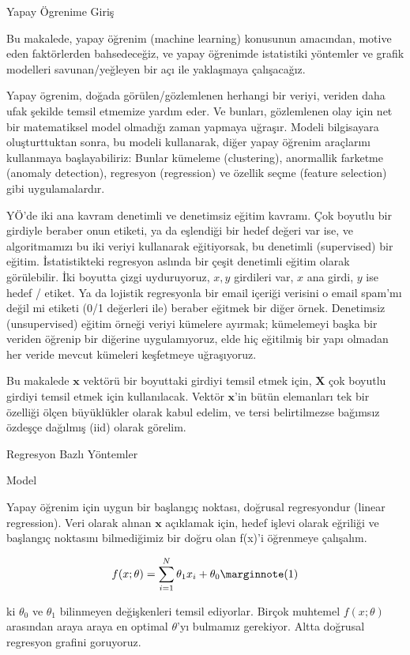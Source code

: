 \documentclass[12pt,fleqn]{article}\usepackage{../../common}
\begin{document}
Yapay Ögrenime Giriş

Bu makalede, yapay öğrenim (machine learning) konusunun amacından, motive eden
faktörlerden bahsedeceğiz, ve yapay öğrenimde istatistiki yöntemler ve
grafik modelleri savunan/yeğleyen bir açı ile yaklaşmaya çalışacağız. 

Yapay ögrenim, doğada görülen/gözlemlenen herhangi bir veriyi, veriden daha ufak
şekilde temsil etmemize yardım eder. Ve bunları, gözlemlenen olay için net bir
matematiksel model olmadığı zaman yapmaya uğraşır. Modeli bilgisayara
oluşturttuktan sonra, bu modeli kullanarak, diğer yapay öğrenim araçlarını
kullanmaya başlayabiliriz: Bunlar kümeleme (clustering), anormallik farketme
(anomaly detection), regresyon (regression) ve özellik seçme (feature selection)
gibi uygulamalardır.

YÖ'de iki ana kavram denetimli ve denetimsiz eğitim kavramı. Çok boyutlu
bir girdiyle beraber onun etiketi, ya da eşlendiği bir hedef değeri var
ise, ve algoritmamızı bu iki veriyi kullanarak eğitiyorsak, bu denetimli
(supervised) bir eğitim. İstatistikteki regresyon aslında bir çeşit
denetimli eğitim olarak görülebilir. İki boyutta çizgi uyduruyoruz, $x,y$
girdileri var, $x$ ana girdi, $y$ ise hedef / etiket. Ya da lojistik
regresyonla bir email içeriği verisini o email spam'mı değil mi etiketi
(0/1 değerleri ile) beraber eğitmek bir diğer örnek. Denetimsiz
(unsupervised) eğitim örneği veriyi kümelere ayırmak; kümelemeyi başka bir
veriden öğrenip bir diğerine uygulamıyoruz, elde hiç eğitilmiş bir yapı
olmadan her veride mevcut kümeleri keşfetmeye uğraşıyoruz.

Bu makalede $\mathbf{x}$ vektörü bir boyuttaki girdiyi temsil etmek için,
$\mathbf{X}$ çok boyutlu girdiyi temsil etmek için kullanılacak. Vektör
$\mathbf{x}$'in bütün elemanları tek bir özelliği ölçen büyüklükler olarak
kabul edelim, ve tersi belirtilmezse bağımsız özdeşçe dağılmış (iid) olarak
görelim.

Regresyon Bazlı Yöntemler

Model

Yapay öğrenim için uygun bir başlangıç noktası, doğrusal regresyondur (linear
regression). Veri olarak alınan $\mathbf{x}$ açıklamak için, hedef işlevi olarak
eğriliği ve başlangıç noktasını bilmediğimiz bir doğru olan f(x)'i öğrenmeye
çalışalım. 

$$
  f(x;\theta) = \sum_{i=1}^N \theta_{1}x_{i} + \theta_{0}
  \mlabel{1}
$$

ki $\theta_{0}$ ve $\theta_{1}$ bilinmeyen değişkenleri temsil ediyorlar. Birçok
muhtemel $f(x;\theta)$ arasından araya araya en optimal $\theta$'yı bulmamız
gerekiyor. Altta doğrusal regresyon grafini goruyoruz.
\end{document}
